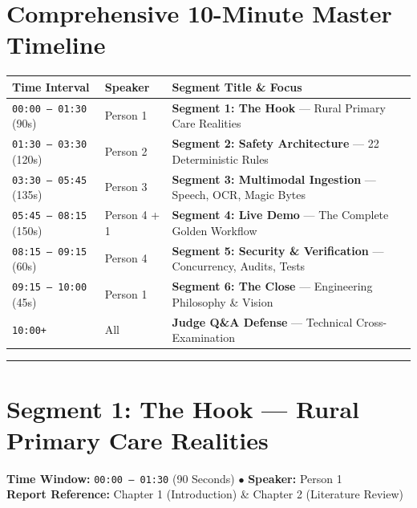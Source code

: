 \documentclass[11pt,a4paper]{article}
\begin{document}
\section*{Comprehensive 10-Minute Master Timeline}

\begin{center}
\begin{tabularx}{0.95\textwidth}{llX}
  \toprule
  \textbf{Time Interval} & \textbf{Speaker} & \textbf{Segment Title \& Focus} \\
  \midrule
  \texttt{00:00 -- 01:30} (90s) & Person 1 & \textbf{Segment 1: The Hook} --- Rural Primary Care Realities \\
  \texttt{01:30 -- 03:30} (120s) & Person 2 & \textbf{Segment 2: Safety Architecture} --- 22 Deterministic Rules \\
  \texttt{03:30 -- 05:45} (135s) & Person 3 & \textbf{Segment 3: Multimodal Ingestion} --- Speech, OCR, Magic Bytes \\
  \texttt{05:45 -- 08:15} (150s) & Person 4 + 1 & \textbf{Segment 4: Live Demo} --- The Complete Golden Workflow \\
  \texttt{08:15 -- 09:15} (60s) & Person 4 & \textbf{Segment 5: Security \& Verification} --- Concurrency, Audits, Tests \\
  \texttt{09:15 -- 10:00} (45s) & Person 1 & \textbf{Segment 6: The Close} --- Engineering Philosophy \& Vision \\
  \texttt{10:00+} & All & \textbf{Judge Q\&A Defense} --- Technical Cross-Examination \\
  \bottomrule
\end{tabularx}
\end{center}

\vspace{4mm}
\hrule
\vspace{6mm}

\section{Segment 1: The Hook --- Rural Primary Care Realities}
\noindent \textbf{Time Window:} \texttt{00:00 -- 01:30} (90 Seconds) \quad $\bullet$ \quad \textbf{Speaker:} Person 1\\
\textbf{Report Reference:} Chapter 1 (Introduction) \& Chapter 2 (Literature Review)
\end{document}
